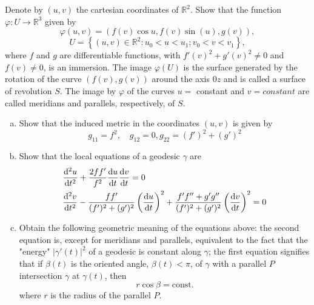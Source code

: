 \documentclass[a4paper]{article}
\begin{document}
Denote by $(u,v)$ the cartesian coordinates of $\mathds{R}^2$. Show that the function $\varphi: U \rightarrow \mathds{R}^3$ given by 
\[
  \varphi(u,v) = (f(v) \cos u, f(v) \sin(u), g(v)),
\]
\[
  U = \left\{ (u,v) \in \mathds{R}^2: u_0 < u < u_1; v_0 < v < v_1 \right\},
\]
where $f$ and $g$ are differentiable functions, with $f'(v)^2 + g'(v)^2 \neq 0$ and $f(v) \neq 0$, is an immersion. The image $\varphi(U)$ is the surface generated by the rotation of the curve $(f(v), g(v))$ around the axis $0z$ and is called a surface of revolution $S$. The image by $\varphi$ of the curves $u = $ constant and $v = constant$ are called meridians and parallels, respectively, of $S$.
\begin{enumerate}[a)]
  \item Show that the induced metric in the coordinates $(u,v)$ is given by 
    \[
      g_{11} = f^2, \quad g_{12} = 0, g_{22} = (f')^2 + (g')^2
    \]
  \item Show that the local equations of a geodesic $\gamma$ are
    \[
      \begin{aligned}
        &\dv[2]{u}{t} + \frac{2 ff'}{f^2} \dv{u}{t} \dv{v}{t} = 0 \\
        &\dv[2]{v}{t} - \frac{ff'}{(f')^2 + (g')^2} \left( \dv{u}{t} \right)^2 + \frac{f'f'' + g'g''}{(f')^2 + (g')^2} \left( \dv{v}{t} \right)^2 = 0
      \end{aligned}
    \]
  \item Obtain the following geometric meaning of the equations above: the second equation is, except for meridians and parallels, equivalent to the fact that the "energy" $|\gamma'(t)|^2$ of a geodesic is constant along $\gamma$; the first equation signifies that if $\beta(t)$ is the oriented angle, $\beta(t) < \pi$, of $\gamma$ with a parallel $P$ intersection $\gamma$ at $\gamma(t)$, then 
    \[
      r \cos \beta = \text{const.}
    \]
    where $r$ is the radius of the parallel $P$.
\end{enumerate}
\end{document}
